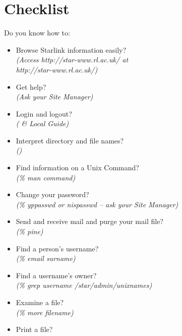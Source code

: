 \newpage

\section {\label{AppendixB}Checklist}
Do you know how to:
\begin{itemize}
\item Browse Starlink information easily?\\
\hspace*{10mm} {\em (Access
                                 {http://star-www.rl.ac.uk/} at\\
\hspace*{10mm} http://star-www.rl.ac.uk/)}
\item Get help?\\
\hspace*{10mm} {\em (Ask your Site Manager)}
\item Login and logout?\\
\hspace*{10mm} {\em ( \& Local Guide)}
\item Interpret directory and file names?\\
\hspace*{10mm} {\em ()}
\item Find information on a Unix Command?\\
\hspace*{10mm} {\em (\% man command)}
\item Change your password?\\
\hspace*{10mm} {\em (\% yppasswd or nispasswd -- ask your Site Manager)}
\item Send and receive mail and purge your mail file?\\
\hspace*{10mm} {\em (\% pine)}
\item Find a person's username?\\
\hspace*{10mm} {\em (\% email surname)}
\item Find a username's owner?\\
\hspace*{10mm} {\em (\% grep username /star/\-admin/\-unixnames)}
\item Examine a file?\\
\hspace*{10mm} {\em (\% more filename)}
\item Print a file?\\

\end{itemize}

